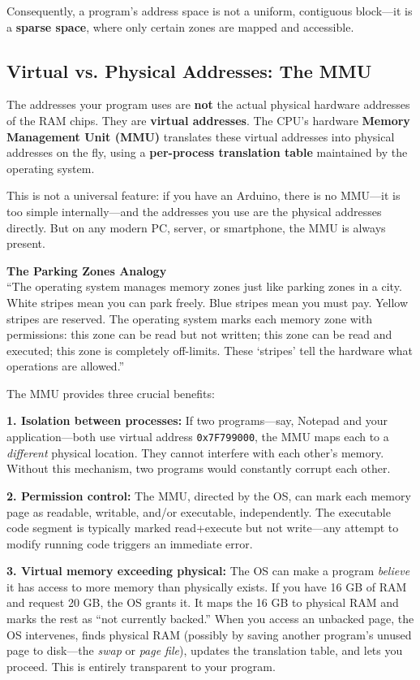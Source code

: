 Consequently, a program's address space is not a uniform, contiguous block---it is a \textbf{sparse space}, where only certain zones are mapped and accessible.

\subsection{Virtual vs. Physical Addresses: The MMU}

The addresses your program uses are \textbf{not} the actual physical hardware addresses of the RAM chips. They are \textbf{virtual addresses}. The CPU's hardware \textbf{Memory Management Unit (MMU)} translates these virtual addresses into physical addresses on the fly, using a \textbf{per-process translation table} maintained by the operating system.

This is not a universal feature: if you have an Arduino, there is no MMU---it is too simple internally---and the addresses you use are the physical addresses directly. But on any modern PC, server, or smartphone, the MMU is always present.

\begin{insightbox}
\textbf{The Parking Zones Analogy} \\
``The operating system manages memory zones just like parking zones in a city. White stripes mean you can park freely. Blue stripes mean you must pay. Yellow stripes are reserved. The operating system marks each memory zone with permissions: this zone can be read but not written; this zone can be read and executed; this zone is completely off-limits. These `stripes' tell the hardware what operations are allowed.''
\end{insightbox}

The MMU provides three crucial benefits:

\textbf{1. Isolation between processes:} If two programs---say, Notepad and your application---both use virtual address \texttt{0x7F799000}, the MMU maps each to a \emph{different} physical location. They cannot interfere with each other's memory. Without this mechanism, two programs would constantly corrupt each other.

\textbf{2. Permission control:} The MMU, directed by the OS, can mark each memory page as readable, writable, and/or executable, independently. The executable code segment is typically marked read+execute but not write---any attempt to modify running code triggers an immediate error.

\textbf{3. Virtual memory exceeding physical:} The OS can make a program \emph{believe} it has access to more memory than physically exists. If you have 16 GB of RAM and request 20 GB, the OS grants it. It maps the 16 GB to physical RAM and marks the rest as ``not currently backed.'' When you access an unbacked page, the OS intervenes, finds physical RAM (possibly by saving another program's unused page to disk---the \emph{swap} or \emph{page file}), updates the translation table, and lets you proceed. This is entirely transparent to your program.

